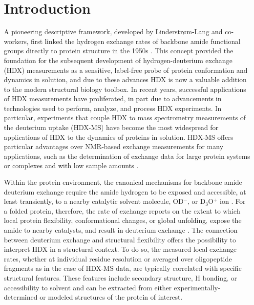 \documentclass[9pt,tutorial]{livecoms}
\begin{document}
\section{Introduction}
A pioneering descriptive framework, developed by Linderstrøm-Lang and co-workers, first linked the hydrogen exchange rates of backbone amide functional groups directly to protein structure in the 1950s \cite{Hvidt1954, Englander1997}. 
This concept provided the foundation for the subsequent development of hydrogen-deuterium exchange (HDX) measurements as a sensitive, label-free probe of protein conformation and dynamics in solution, and due to these advances HDX is now a valuable addition to the modern structural biology toolbox. 
In recent years, successful applications of HDX measurements have proliferated, in part due to advancements in technologies used to perform, analyze, and process HDX experiments. 
In particular, experiments that couple HDX to mass spectrometry measurements of the deuterium uptake (HDX-MS) have become the most widespread for applications of HDX to the dynamics of proteins in solution.
HDX-MS offers particular advantages over NMR-based exchange measurements for many applications, such as the determination of exchange data for large protein systems or complexes and with low sample amounts \cite{Oganesyan2018, Engen2020, James2021}.

Within the protein environment, the canonical mechanisms for backbone amide deuterium exchange require the amide hydrogen to be exposed and accessible, at least transiently, to a nearby catalytic solvent molecule, OD$^-$, or D$_3$O$^+$ ion \cite{Hvidt1966, Englander1983}.
For a folded protein, therefore, the rate of exchange reports on the extent to which local protein flexibility, conformational changes, or global unfolding, expose the amide to nearby catalysts, and result in deuterium exchange \cite{Hvidt1966, Englander1997, Englander1983, Oganesyan2018}.
The connection between deuterium exchange and structural flexibility offers the possibility to interpret HDX in a structural context.
To do so, the measured local exchange rates, whether at individual residue resolution or averaged over oligopeptide fragments as in the case of HDX-MS data, are typically correlated with specific structural features. 
These features include secondary structure, H bonding, or accessibility to solvent and can be extracted from either experimentally-determined or modeled structures of the protein of interest.
\end{document}
